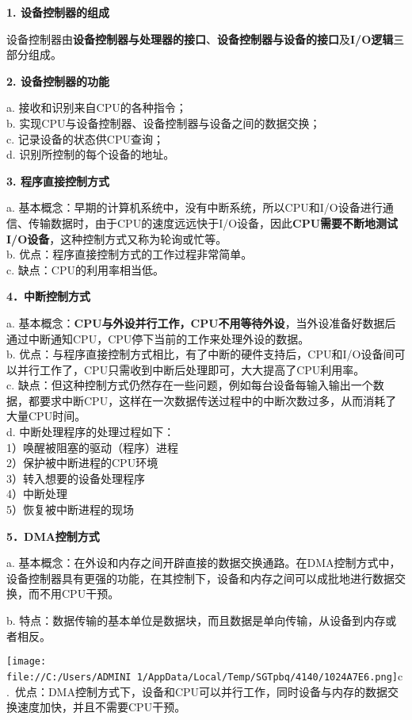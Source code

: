 {\textbf{1. 设备控制器的组成}}

{设备控制器由}\textbf{设备控制器与处理器的接口}{、}\textbf{设备控制器与设备的接口}{及}\textbf{I/O逻辑}{三部分组成。}

{\textbf{2. 设备控制器的功能}}

a. 接收和识别来自CPU的各种指令；\\
b. 实现CPU与设备控制器、设备控制器与设备之间的数据交换；\\
c. 记录设备的状态供CPU查询；\\
d. 识别所控制的每个设备的地址。

{\textbf{3. 程序直接控制方式}}

a.
基本概念：早期的计算机系统中，没有中断系统，所以CPU和I/O设备进行通信、传输数据时，由于CPU的速度远远快于I/O设备，因此\textbf{{CPU需要不断地测试I/O设备}}，这种控制方式又称为轮询或忙等。\\
b. 优点：程序直接控制方式的工作过程非常简单。\\
c. 缺点：CPU的利用率相当低。

\textbf{{4．中断控制方式}}

a.
基本概念：{\textbf{CPU与外设并行工作，CPU不用等待外设}}，当外设准备好数据后通过中断通知CPU，CPU停下当前的工作来处理外设的数据。\\
b.
优点：与程序直接控制方式相比，有了中断的硬件支持后，CPU和I/O设备间可以并行工作了，CPU只需收到中断后处理即可，大大提高了CPU利用率。\\
c.
缺点：但这种控制方式仍然存在一些问题，例如每台设备每输入输出一个数据，都要求中断CPU，这样在一次数据传送过程中的中断次数过多，从而消耗了大量CPU时间。\\
d. 中断处理程序的处理过程如下：\\
1）唤醒被阻塞的驱动（程序）进程\\
2）保护被中断进程的CPU环境\\
3）转入想要的设备处理程序\\
4）中断处理\\
5）恢复被中断进程的现场

\textbf{{5．DMA控制方式}}

{a.
基本概念：}{在外设和内存之间开辟直接的数据交换通路}{。在DMA控制方式中，设备控制器具有更强的功能，在其控制下，设备和内存之间可以成批地进行数据交换，而不用CPU干预。}

b.
特点：数据传输的基本单位是数据块，而且数据是单向传输，从设备到内存或者相反。

\texttt{[image: file://C:/Users/ADMINI~1/AppData/Local/Temp/SGTpbq/4140/1024A7E6.png]}c.~优点：{DMA控制方式下，设备和CPU可以并行工作，同时设备与内存的数据交换速度加快，并且不需要CPU干预。}

